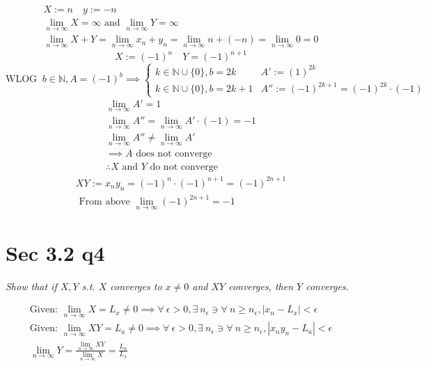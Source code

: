\documentclass[11pt]{article}
\newcommand{\question}[1]{
    \begin{mdframed}[
        linecolor=gray,       %
        linewidth=0.5pt,      %
        innertopmargin=10pt,  %
        innerbottommargin=10pt %
    ]
    \centering \itshape #1
    \end{mdframed}
}
\theoremstyle{plain}
\begin{document}
\[
    \begin{gathered}
    X := n \quad y := -n \\
    \lim_{n \to \infty} X = \infty \text{ and }\lim_{n \to \infty} Y =  \infty  \\
        \lim_{n \to \infty} X+Y = \lim_{n \to \infty} x_n+y_n = \lim_{n \to \infty} n+(-n) = \lim_{n \to \infty} 0 = 0
    \end{gathered}
\] 
\[ X := (-1)^n \quad Y=(-1)^{n+1} \]
\[
	\text{WLOG } ~b \in  \mathbb{N}, A = (-1)^b \implies
	\left\{
	\begin{array}{cc}
		k \in \mathbb{N} \cup \{ 0 \}, b = 2k   & A' := (1)^{2k}                             \\
		k \in \mathbb{N} \cup \{ 0 \}, b = 2k+1 & A'' := (-1)^{2k+1} = (-1)^{2k} \cdot  (-1)
	\end{array}
	\right .
\]
\[
	\begin{gathered}
		\lim_{n \to \infty} A' = 1 \\
		\lim_{n \to \infty} A'' = \lim_{n \to \infty} A' \cdot  (-1) = -1 \\
		\lim_{n \to \infty}  A'' \neq \lim_{n \to \infty} A' \\
		\implies  A \text{ does not converge} \\
        \therefore X \text{ and } Y \text{ do not converge}
	\end{gathered}
\]
\[
    \begin{gathered}
    XY := x_ny_n = (-1)^n \cdot  (-1)^{n+1} = (-1)^{2n+1} \\
        \text{ From above } \lim_{n \to \infty}  (-1)^{2n+1} = -1
    \end{gathered}
\] 

\section*{ Sec 3.2 q4}
\question{ Show that if $X,Y$ s.t. $X$ converges to $x \neq 0$ and $XY$ converges, then $Y$ converges. }
\[
	\begin{gathered}
		\text{Given: } \lim_{n \to \infty} X = L_x \neq 0 \implies \forall~ \epsilon>0, \exists~ n_\epsilon \ni \forall~ n \geq n_\epsilon,  |x_n - L_x| < \epsilon \\
		\text{Given: } \lim_{n \to \infty} XY = L_a \neq 0 \implies \forall~ \epsilon>0, \exists~ n_\epsilon \ni \forall~ n \geq n_\epsilon,  |x_ny_n - L_a| < \epsilon \\
		\lim_{n \to \infty} Y = \frac{\lim_{n \to \infty} XY}{\lim_{n \to \infty} X} = \frac{L_a}{L_x}
	\end{gathered}
\]
\end{document}
